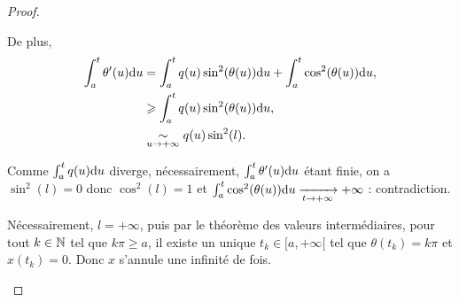 \documentclass[12pt]{article}
\begin{document}
\begin{proof}
\begin{enumerate}
		De plus, 
		\begin{align}
			\int_{a}^{t}\theta'(u)\mathrm{d} u
			&=\int_{a}^{t}q(u)\sin^{2}(\theta(u))\mathrm{d} u+\int_{a}^{t}\cos^{2}(\theta(u))\mathrm{d} u,\\
			&\geqslant\int_{a}^{t}q(u)\sin^{2}(\theta(u))\mathrm{d} u,\\
			&\underset{u\to+\infty}{\sim}q(u)\sin^{2}(l).
		\end{align}

		Comme $\int_{a}^{t}q(u)\mathrm{d} u$ diverge, nécessairement, $\int_{a}^{t}\theta'(u)\mathrm{d} u$ étant finie, on a $\sin^{2}(l)=0$ donc $\cos^{2}(l)=1$ et 
		$\int_{a}^{t}\cos^{2}(\theta(u))\mathrm{d} u\xrightarrow[t\to+\infty]{}+\infty$ : contradiction. 

		Nécessairement, $l=+\infty$, puis par le théorème des valeurs intermédiaires, pour tout $k\in\mathbb{N}$ tel que $k\pi\geqslant a$, il existe un unique $t_k\in[a,+\infty[$ tel que $\theta(t_k)=k\pi$ et $x(t_k)=0$. Donc $x$ s'annule une infinité de fois.
	\end{enumerate}
\end{proof}
\end{document}

